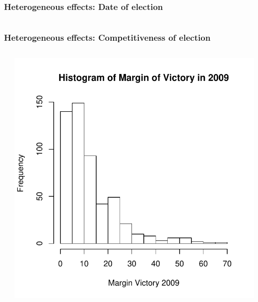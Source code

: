 \documentclass{beamer}
\begin{document}
\begin{frame}
\frametitle{Heterogeneous effects: Date of election}
\begin{columns}[T] %
\begin{column}{.55\textwidth}
\scalebox{.6}{
\vbox{%
\vspace{-40pt}
 }}
\end{column}%
\hfill%
\begin{column}{.35\textwidth}
\end{column}%
\end{columns}

{\footnotesize {}}

\end{frame}

\begin{frame}
\frametitle{Heterogeneous effects: Competitiveness of election}
\begin{columns}[T] %
\begin{column}{.38\textwidth}
\scalebox{.6}{
\vbox{%
\vspace{-40pt}
 }}
\end{column}%
\hfill%
\begin{column}{.58\textwidth}
\vspace{-10pt}
\includegraphics[scale=.5]{../Figures/histcomp.pdf}
\end{column}%
\end{columns}
\end{frame}
\end{document}
